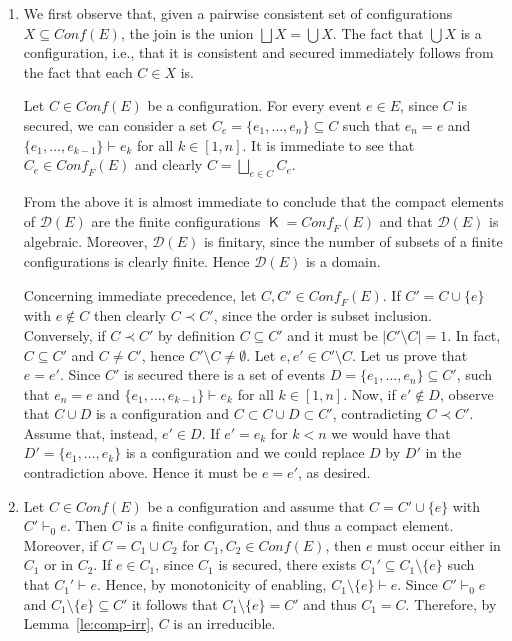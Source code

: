 \documentclass[conference]{IEEEtran}
\renewenvironment{proof}{\begin{IEEEproof}}{\end{IEEEproof}}
\newcommand{\compact}[1]{\ensuremath{\mathop{\mathsf{K}({#1})}}}
\newcommand{\conf}[1]{\ensuremath{\mathit{Conf}({#1})}}
\newcommand{\conff}[1]{\ensuremath{\mathit{Conf_F}({#1})}}
\newcommand{\zdom}[0]{\ensuremath{\mathcal{D}}}
\newcommand{\dom}[1]{\ensuremath{\zdom({#1})}}
\newcommand{\interval}[2][1]{\ensuremath{[{#1},{#2}]}}
\begin{document}
\begin{proof}
  \begin{enumerate}
  \item
    We first observe that, given a pairwise consistent set of
    configurations $X \subseteq \conf{E}$, the join is the union
    $\bigsqcup X = \bigcup X$. The fact that $\bigcup X$ is a
    configuration, i.e., that it is consistent and secured immediately
    follows from the fact that each $C \in X$ is.


    Let $C \in \conf{E}$ be a configuration.  For every event $e \in E$,
    since $C$ is secured, we can consider a set
    $C_e = \{ e_1, \ldots, e_n \} \subseteq C$ such that $e_n =e$ and
    $\{ e_1, \ldots, e_{k-1} \} \vdash e_k$ for all
    $k \in \interval{n}$. It is immediate to see that
    $C_e \in \conff{E}$ and clearly $C = \bigsqcup_{e \in C} C_e$.
    
    From the above it is almost immediate to conclude that the
    compact elements of $\dom{{E}}$ are the finite configurations
    $\compact{\dom{E}} =\conff{E}$ and that $\dom{{E}}$ is algebraic.
    Moreover, $\dom{E}$ is finitary, since the number of subsets of a
    finite configurations is clearly finite. Hence $\dom{{E}}$ is a
    domain.

    Concerning immediate precedence, let $C, C' \in \conff{E}$. If
    $C' = C \cup \{ e \}$ with $e \not\in C$ then clearly
    $C \prec C'$, since the order is subset inclusion. Conversely,
      if $C \prec C'$ by definition $C \subseteq C'$ and it must be
      $|C' \setminus C| = 1$. In fact, $C \subseteq C'$ and
      $C \neq C'$, hence $C' \setminus C \neq \emptyset$. Let
    $e, e' \in C' \setminus C$. Let us prove that $e=e'$. Since $C'$
    is secured there is a set of events
    $D = \{ e_1, \ldots, e_n \} \subseteq C'$, such that $e_n = e$ and
    $\{ e_1, \ldots, e_{k-1} \} \vdash e_k$ for all
    $k \in \interval{n}$. Now, if $e' \not\in D$, observe that
    $C \cup D$ is a configuration and $C \subset C \cup D \subset C'$,
    contradicting $C \prec C'$.
%
    Assume that, instead, $e' \in D$. If $e' = e_k$ for $k< n$ we would
    have that $D' = \{ e_1, \ldots, e_k \}$ is a configuration and we
    could replace $D$ by $D'$ in the contradiction above. Hence it
    must be $e =e'$, as desired.

    \medskip
  

  \item Let $C \in \conf{{E}}$ be a configuration and assume
    that $C = C' \cup \{ e \}$ with $C' \vdash_0 e$. Then $C$ is a finite configuration, and thus a compact element. Moreover, if
    $C = C_1 \cup C_2$ for $C_1, C_2 \in \conf{{E}}$, 
    then $e$ must occur either in $C_1$ or in
    $C_2$. If $e \in C_1$, since $C_1$ is secured,
    there exists $C_1' \subseteq C_1 \setminus \{ e \}$ such that
    $C_1' \vdash e$. Hence, by monotonicity of enabling,
    $C_1 \setminus \{ e \} \vdash e$. Since $C' \vdash_0 e$ and
    $C_1 \setminus \{ e \} \subseteq C'$ it follows that
    $C_1 \setminus \{ e \} = C'$ and thus $C_1 = C$.
    Therefore, by Lemma~\ref{le:comp-irr}, $C$ is an irreducible.
    

\end{enumerate}
\end{proof}
\end{document}
